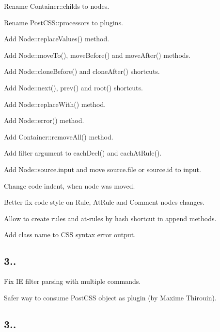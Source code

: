 \begin{DoxyItemize}
\item Rename {\ttfamily Container\+::childs} to {\ttfamily nodes}.
\item Rename {\ttfamily Post\+C\+S\+S\+::processors} to {\ttfamily plugins}.
\item Add {\ttfamily Node\+::replace\+Values()} method.
\item Add {\ttfamily Node\+::move\+To()}, {\ttfamily move\+Before()} and {\ttfamily move\+After()} methods.
\item Add {\ttfamily Node\+::clone\+Before()} and {\ttfamily clone\+After()} shortcuts.
\item Add {\ttfamily Node\+::next()}, {\ttfamily prev()} and {\ttfamily root()} shortcuts.
\item Add {\ttfamily Node\+::replace\+With()} method.
\item Add {\ttfamily Node\+::error()} method.
\item Add {\ttfamily Container\+::remove\+All()} method.
\item Add filter argument to {\ttfamily each\+Decl()} and {\ttfamily each\+At\+Rule()}.
\item Add {\ttfamily Node\+::source.\+input} and move {\ttfamily source.\+file} or {\ttfamily source.\+id} to {\ttfamily input}.
\item Change code indent, when node was moved.
\item Better fix code style on {\ttfamily Rule}, {\ttfamily At\+Rule} and {\ttfamily Comment} nodes changes.
\item Allow to create rules and at-\/rules by hash shortcut in append methods.
\item Add class name to C\+SS syntax error output.
\end{DoxyItemize}

\subsection*{3..}


\begin{DoxyItemize}
\item Fix IE filter parsing with multiple commands.
\item Safer way to consume Post\+C\+SS object as plugin (by Maxime Thirouin).
\end{DoxyItemize}

\subsection*{3..}


